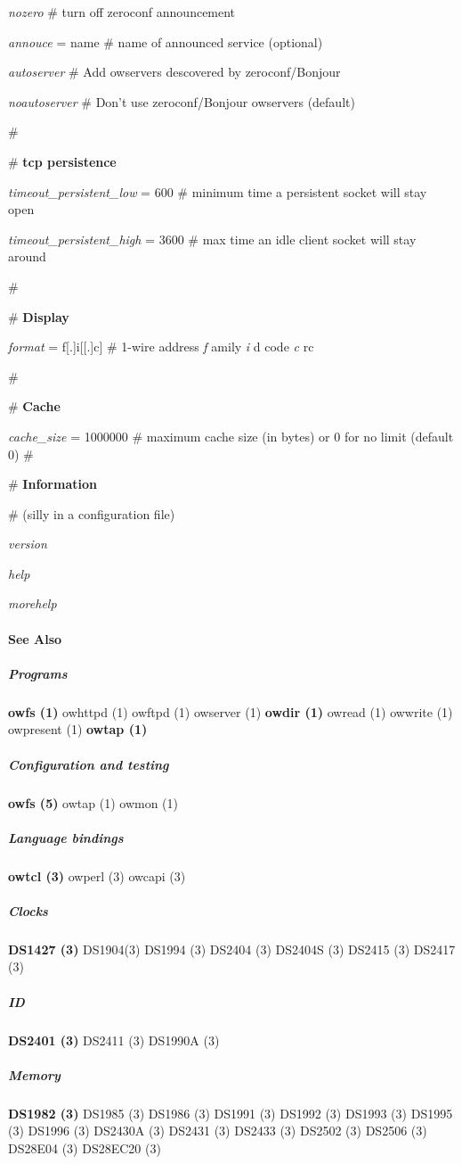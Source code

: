 \begin{description}
\textit{nozero} \#   turn off zeroconf announcement 

\textit{annouce} = name  \# name of announced service (optional) 

\textit{autoserver} \#   Add owservers descovered by zeroconf/Bonjour 

\textit{noautoserver} \#   Don't use zeroconf/Bonjour owservers (default) 

\# 

\# \textbf{tcp persistence} 

\textit{timeout\_persistent\_low} = 600 \# minimum time a persistent socket will stay
open 

\textit{timeout\_persistent\_high} = 3600 \# max time an idle client socket will stay
around 

\textit{} 

\# 

\# \textbf{Display} 

\textit{format} = f[.]i[[.]c] \# 1-wire address \textit{f} amily \textit{i} d code \textit{c} rc 

\# 

\# \textbf{Cache} 

\textit{cache\_size} = 1000000 \# maximum cache size (in bytes) or 0 for no limit
(default 0) \# 

\# \textbf{Information} 

\# (silly in a configuration file) 

\textit{version} 

\textit{help} 

\textit{morehelp} 
\end{description}

\paragraph*{See Also}

\subparagraph*{Programs}\textsf{\textbf{owfs (1)} \textsf{owhttpd (1)} \textsf{owftpd (1)} \textsf{owserver (1)}} \textsf{\textbf{owdir
(1)} \textsf{owread (1)} \textsf{owwrite (1)} \textsf{owpresent (1)}} \textsf{\textbf{owtap (1)}} 
\subparagraph*{Configuration and testing}\textsf{\textbf{owfs
(5)} \textsf{owtap (1)} \textsf{owmon (1)}} 
\subparagraph*{Language bindings}\textsf{\textbf{owtcl (3)} \textsf{owperl (3)} \textsf{owcapi (3)}}

\subparagraph*{Clocks}\textsf{\textbf{DS1427 (3)} \textsf{DS1904(3)} \textsf{DS1994 (3)} \textsf{DS2404 (3)} \textsf{DS2404S (3)} \textsf{DS2415 (3)}
\textsf{DS2417 (3)}} 
\subparagraph*{ID}\textsf{\textbf{DS2401 (3)} \textsf{DS2411 (3)} \textsf{DS1990A (3)}} 
\subparagraph*{Memory}\textsf{\textbf{DS1982 (3)} \textsf{DS1985
(3)} \textsf{DS1986 (3)} \textsf{DS1991 (3)} \textsf{DS1992 (3)} \textsf{DS1993 (3)} \textsf{DS1995 (3)} \textsf{DS1996 (3)} \textsf{DS2430A
(3)} \textsf{DS2431 (3)} \textsf{DS2433 (3)} \textsf{DS2502 (3)} \textsf{DS2506 (3)} \textsf{DS28E04 (3)} \textsf{DS28EC20 (3)}}

